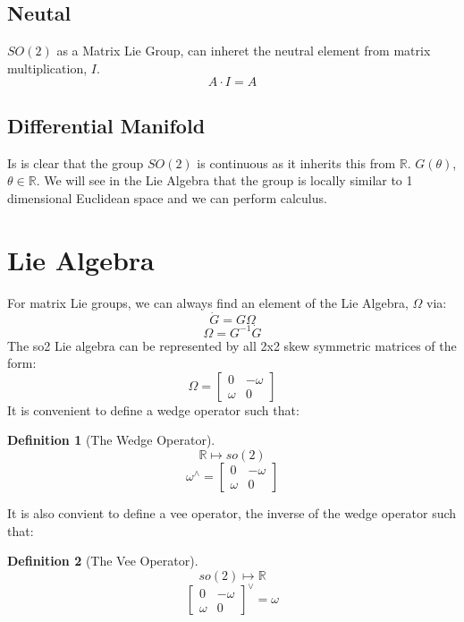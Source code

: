 \documentclass{book}
\newtheorem{definition}{Definition}
\begin{document}
\subsection*{Neutal}
%
$SO(2)$ as a Matrix Lie Group, can inheret the neutral element from matrix multiplication, $I$.
%
$$A\cdot I = A$$

\subsection*{Differential Manifold}
Is is clear that the group $SO(2)$ is continuous as it inherits this from $\mathbb{R}$.
$G(\theta)$, $\theta \in \mathbb{R}$.
We will see in the Lie Algebra that the group is locally similar to 1 dimensional Euclidean space
and we can perform calculus.


\section{Lie Algebra}
%
For matrix Lie groups, we can always find an element of the Lie Algebra, $\Omega$ via:
%
$$\dot{G} = G\Omega$$
%
$$\Omega = G^{-1}\dot{G}$$
%
The so2 Lie algebra can be represented by all 2x2 skew symmetric matrices of the form:
%
$$\Omega = \begin{bmatrix}
0 & - \omega\\
\omega & 0
\end{bmatrix}$$
%
It is convenient to define a wedge operator such that:

\begin{definition}[The Wedge Operator]
$$\mathbb{R} \mapsto so(2)$$
$$\omega^{\wedge} = \begin{bmatrix}
    0 & - \omega\\
    \omega & 0
    \end{bmatrix}$$
\end{definition}
%
It is also convient to define a vee operator, the inverse of the wedge operator such that:
%
\begin{definition}[The Vee Operator]
$$so(2) \mapsto \mathbb{R}$$
$$\begin{bmatrix}
0 & - \omega\\
\omega & 0
\end{bmatrix}^{\vee} = \omega$$
\end{definition}
\end{document}
